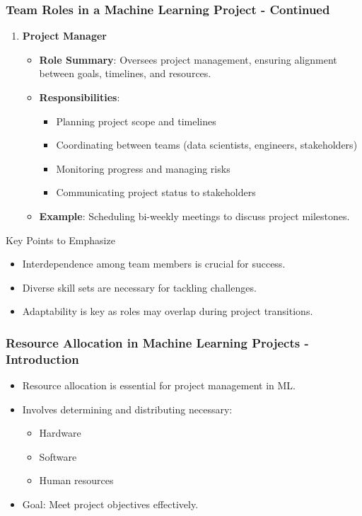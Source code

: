 \documentclass[aspectratio=169]{beamer}
\begin{document}
\begin{frame}[fragile]
    \frametitle{Team Roles in a Machine Learning Project - Continued}
    \begin{enumerate}[resume]
        \item \textbf{Project Manager}
            \begin{itemize}
                \item \textbf{Role Summary}: Oversees project management, ensuring alignment between goals, timelines, and resources.
                \item \textbf{Responsibilities}:
                    \begin{itemize}
                        \item Planning project scope and timelines
                        \item Coordinating between teams (data scientists, engineers, stakeholders)
                        \item Monitoring progress and managing risks
                        \item Communicating project status to stakeholders
                    \end{itemize}
                \item \textbf{Example}: Scheduling bi-weekly meetings to discuss project milestones.
            \end{itemize}
    \end{enumerate}
    
    \begin{block}{Key Points to Emphasize}
        \begin{itemize}
            \item Interdependence among team members is crucial for success.
            \item Diverse skill sets are necessary for tackling challenges.
            \item Adaptability is key as roles may overlap during project transitions.
        \end{itemize}
    \end{block}
\end{frame}

\begin{frame}[fragile]
    \frametitle{Resource Allocation in Machine Learning Projects - Introduction}
    \begin{itemize}
        \item Resource allocation is essential for project management in ML.
        \item Involves determining and distributing necessary:
        \begin{itemize}
            \item Hardware
            \item Software
            \item Human resources
        \end{itemize}
        \item Goal: Meet project objectives effectively.
    \end{itemize}
\end{frame}
\end{document}
